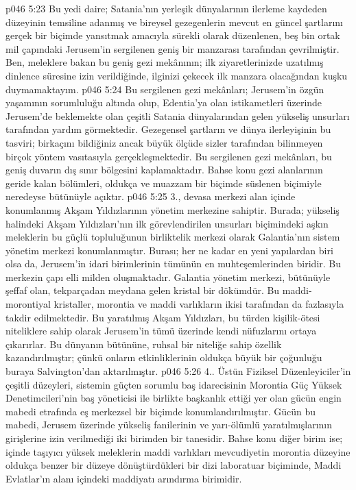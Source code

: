 \vs p046 5:23 Bu yedi daire; Satania’nın yerleşik dünyalarının ilerleme kaydeden düzeyinin temsiline adanmış ve bireysel gezegenlerin mevcut en güncel şartlarını gerçek bir biçimde yansıtmak amacıyla sürekli olarak düzenlenen, beş bin ortak mil çapındaki Jerusem’in sergilenen geniş bir manzarası tarafından çevrilmiştir. Ben, meleklere bakan bu geniş gezi mekânının; ilk ziyaretlerinizde uzatılmış dinlence süresine izin verildiğinde, ilginizi çekecek ilk manzara olacağından kuşku duymamaktayım.
\vs p046 5:24 Bu sergilenen gezi mekânları; Jerusem’in özgün yaşamının sorumluluğu altında olup, Edentia’ya olan istikametleri üzerinde Jerusem’de beklemekte olan çeşitli Satania dünyalarından gelen yükseliş unsurları tarafından yardım görmektedir. Gezegensel şartların ve dünya ilerleyişinin bu tasviri; birkaçını bildiğiniz ancak büyük ölçüde sizler tarafından bilinmeyen birçok yöntem vasıtasıyla gerçekleşmektedir. Bu sergilenen gezi mekânları, bu geniş duvarın dış sınır bölgesini kaplamaktadır. Bahse konu gezi alanlarının geride kalan bölümleri, oldukça ve muazzam bir biçimde süslenen biçimiyle neredeyse bütünüyle açıktır.
\vs p046 5:25 3.\bibnobreakspace {}, devasa merkezi alan içinde konumlanmış Akşam Yıldızlarının yönetim merkezine sahiptir. Burada; yükseliş halindeki Akşam Yıldızları’nın ilk görevlendirilen unsurları biçimindeki aşkın meleklerin bu güçlü topluluğunun birliktelik merkezi olarak Galantia’nın sistem yönetim merkezi konumlanmıştır. Burası; her ne kadar en yeni yapılardan biri olsa da, Jerusem’in idari birimlerinin tümünün en muhteşemlerinden biridir. Bu merkezin çapı elli milden oluşmaktadır. Galantia yönetim merkezi, bütünüyle şeffaf olan, tekparçadan meydana gelen kristal bir dökümdür. Bu maddi\hyp{}morontiyal kristaller, morontia ve maddi varlıkların ikisi tarafından da fazlasıyla takdir edilmektedir. Bu yaratılmış Akşam Yıldızları, bu türden kişilik\hyp{}ötesi niteliklere sahip olarak Jerusem’in tümü üzerinde kendi nüfuzlarını ortaya çıkarırlar. Bu dünyanın bütününe, ruhsal bir niteliğe sahip özellik kazandırılmıştır; çünkü onların etkinliklerinin oldukça büyük bir çoğunluğu buraya Salvington’dan aktarılmıştır.
\vs p046 5:26 4.. Üstün Fiziksel Düzenleyiciler’in çeşitli düzeyleri, sistemin güçten sorumlu baş idarecisinin Morontia Güç Yüksek Denetimcileri’nin baş yöneticisi ile birlikte başkanlık ettiği yer olan gücün engin mabedi etrafında eş merkezsel bir biçimde konumlandırılmıştır. Gücün bu mabedi, Jerusem üzerinde yükseliş fanilerinin ve yarı\hyp{}ölümlü yaratılmışlarının girişlerine izin verilmediği iki birimden bir tanesidir. Bahse konu diğer birim ise; içinde taşıyıcı yüksek meleklerin maddi varlıkları mevcudiyetin morontia düzeyine oldukça benzer bir düzeye dönüştürdükleri bir dizi laboratuar biçiminde, Maddi Evlatlar’ın alanı içindeki maddiyatı arındırma birimidir.

